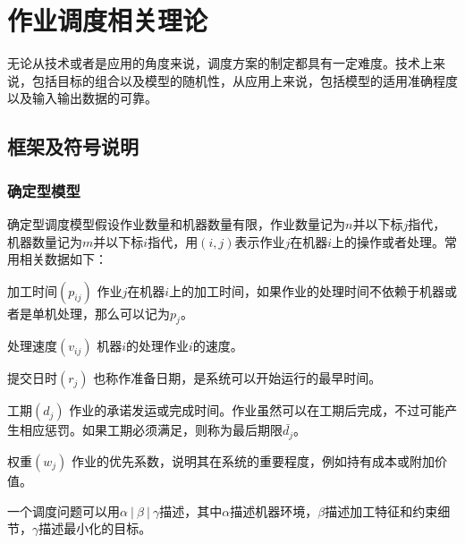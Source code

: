 \chapter{作业调度相关理论}
无论从技术或者是应用的角度来说，调度方案的制定都具有一定难度。技术上来说，包括目标的组合以及模型的随机性，从应用上来说，包括模型的适用准确程度以及输入输出数据的可靠\cite{pinedo}。

\section{框架及符号说明}
\subsection{确定型模型}
确定型调度模型假设作业数量和机器数量有限，作业数量记为$n$并以下标$j$指代，机器数量记为$m$并以下标$i$指代，用$(i,j)$表示作业$j$在机器$i$上的操作或者处理。常用相关数据如下：
\renewcommand{\descriptionlabel}[1]{\heiti{#1}}
\begin{compactdesc}
\item[加工时间$(p_{ij})$]作业$j$在机器$i$上的加工时间，如果作业的处理时间不依赖于机器或者是单机处理，那么可以记为$p_j$。
\item[处理速度$(v_{ij})$]机器$i$的处理作业$i$的速度。
\item[提交日时$(r_j)$]也称作准备日期，是系统可以开始运行的最早时间。
\item[工期$(d_j)$]作业的承诺发运或完成时间。作业虽然可以在工期后完成，不过可能产生相应惩罚。如果工期必须满足，则称为最后期限$\bar{d_j}$。
\item[权重$(w_j)$]作业的优先系数，说明其在系统的重要程度，例如持有成本或附加价值。
\end{compactdesc}

一个调度问题可以用$\alpha\ |\ \beta\ |\ \gamma$描述，其中$\alpha$描述机器环境，$\beta$描述加工特征和约束细节，$\gamma$描述最小化的目标。

